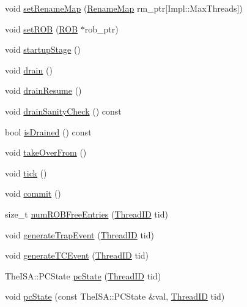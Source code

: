 \begin{DoxyCompactItemize}
\item 
void \hyperlink{classDefaultCommit_a6f0aaedb2c39d674ef86c25d0aeb4211}{setRenameMap} (\hyperlink{classDefaultCommit_a341963bcea1928476182a17e357f98e3}{RenameMap} rm\_\-ptr\mbox{[}Impl::MaxThreads\mbox{]})
\item 
void \hyperlink{classDefaultCommit_a46149ea78698ff6515a509c53d814193}{setROB} (\hyperlink{classROB}{ROB} $\ast$rob\_\-ptr)
\item 
void \hyperlink{classDefaultCommit_a31d4cbdab16d4ff8d6bc7f84ece727da}{startupStage} ()
\item 
void \hyperlink{classDefaultCommit_af7d01b5776b9d8a0f218aec331ddaeb9}{drain} ()
\item 
void \hyperlink{classDefaultCommit_a8f020d3237536fe007fc488c4125c5d8}{drainResume} ()
\item 
void \hyperlink{classDefaultCommit_a0240eb42fa57fe5d3788093f62b77347}{drainSanityCheck} () const 
\item 
bool \hyperlink{classDefaultCommit_adf5473c18a3d7c1e88c4a2072bce5526}{isDrained} () const 
\item 
void \hyperlink{classDefaultCommit_a8674059ce345e23aac5086b2c3e24a43}{takeOverFrom} ()
\item 
void \hyperlink{classDefaultCommit_a873dd91783f9efb4a590aded1f70d6b0}{tick} ()
\item 
void \hyperlink{classDefaultCommit_ad55316f5135cdae6aa6c5a763f6c3473}{commit} ()
\item 
size\_\-t \hyperlink{classDefaultCommit_a3c8eae00d4f0d15336eec11f879146c2}{numROBFreeEntries} (\hyperlink{base_2types_8hh_ab39b1a4f9dad884694c7a74ed69e6a6b}{ThreadID} tid)
\item 
void \hyperlink{classDefaultCommit_a7002d0f2beae1ce9a349218968ff97c3}{generateTrapEvent} (\hyperlink{base_2types_8hh_ab39b1a4f9dad884694c7a74ed69e6a6b}{ThreadID} tid)
\item 
void \hyperlink{classDefaultCommit_a4adb99d6e22b7028a21e537331de6253}{generateTCEvent} (\hyperlink{base_2types_8hh_ab39b1a4f9dad884694c7a74ed69e6a6b}{ThreadID} tid)
\item 
TheISA::PCState \hyperlink{classDefaultCommit_af486ac7476906f63fc6696b3e76a411b}{pcState} (\hyperlink{base_2types_8hh_ab39b1a4f9dad884694c7a74ed69e6a6b}{ThreadID} tid)
\item 
void \hyperlink{classDefaultCommit_aaa8fbb79b13ce112b6d11f77bc3dd18f}{pcState} (const TheISA::PCState \&val, \hyperlink{base_2types_8hh_ab39b1a4f9dad884694c7a74ed69e6a6b}{ThreadID} tid)
\item 

\end{DoxyCompactItemize}
